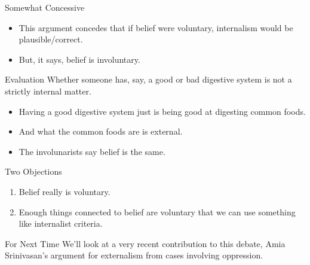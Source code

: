 \documentclass[
  17pt,
  letterpaper,
  ignorenonframetext,
  aspectratio=169,
  handout]{beamer}
\providecommand{\tightlist}{%
  \setlength{\itemsep}{0pt}\setlength{\parskip}{0pt}}\usepackage{longtable,booktabs,array}
\begin{document}
\begin{frame}{Somewhat Concessive}
\protect\hypertarget{somewhat-concessive}{}
\begin{itemize}[<+->]
\tightlist
\item
  This argument concedes that if belief were voluntary, internalism
  would be plausible/correct.
\item
  But, it says, belief is involuntary.
\end{itemize}
\end{frame}

\begin{frame}{Evaluation}
\protect\hypertarget{evaluation}{}
Whether someone has, say, a good or bad digestive system is not a
strictly internal matter.

\begin{itemize}[<+->]
\tightlist
\item
  Having a good digestive system just is being good at digesting common
  foods.
\item
  And what the common foods are is external.
\item
  The involunarists say belief is the same.
\end{itemize}
\end{frame}

\begin{frame}{Two Objections}
\protect\hypertarget{two-objections}{}
\begin{enumerate}[<+->]
\tightlist
\item
  Belief really is voluntary.
\item
  Enough things connected to belief are voluntary that we can use
  something like internalist criteria.
\end{enumerate}
\end{frame}

\begin{frame}{For Next Time}
\protect\hypertarget{for-next-time}{}
We'll look at a very recent contribution to this debate, Amia
Srinivasan's argument for externalism from cases involving oppression.
\end{frame}
\end{document}
